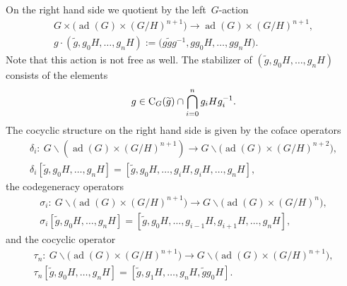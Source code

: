 \documentclass[pdftex]{sigma}
\numberwithin{equation}{section}
\DeclareMathOperator{\ad}{ad}
\begin{document}
On the right hand side we quotient by the left~$G$-action
\begin{gather*}%
G\times \big(\ad(G)\times (G/H)^{n+1}\big) \longrightarrow \ad(G)\times (G/H)^{n+1},
\\
g\cdot(\widetilde{g}, g_{0}H,\ldots, g_{n}H) :=\big(g\widetilde{g}g^{-1}, g g_{0}H,\ldots, g g_{n}H\big).
\end{gather*}
Note that this action is not free as well.
The stabilizer of $(\widetilde{g}, g_{0}H,\ldots, g_{n}H)$ consists of the elements
\begin{gather}
\label{stab-RHS}
g   \in {\rm C}_{G}(\widetilde{g})\cap\bigcap_{i=0}^{n}g_{i}H g_{i}^{-1}.
\end{gather}
The cocyclic structure on the right hand side is given by the coface operators
\begin{gather}
\delta_{i}\colon \  G\backslash (\ad(G)\times (G/H)^{n+1}) \longrightarrow G\backslash \big(\ad(G)\times (G/H)^{n+2}\big),
\nonumber
\\
\delta_{i}[\widetilde{g}, g_{0}H,\ldots, g_{n}H] =\left[\widetilde{g}, g_{0}H,\ldots, g_{i}H, g_{i}H,\ldots,g_{n}H\right],
\label{cofaces-RHS}
\end{gather}
the codegeneracy operators
\begin{gather}
\sigma_{i}\colon \  G\backslash \big(\ad(G)\times (G/H)^{n+1}\big) \longrightarrow G\backslash \big(\ad(G)\times (G/H)^{n}\big),
\nonumber
\\
\sigma_{i}[\widetilde{g}, g_{0}H,\ldots, g_{n}H] =[\widetilde{g}, g_{0}H,\ldots,g_{i-1}H, g_{i+1}H, \ldots, g_{n}H],
\label{codegen-RHS}
\end{gather}
and the cocyclic operator
\begin{gather}
\tau_{n}\colon \  G\backslash \big(\ad(G)\times (G/H)^{n+1}\big) \longrightarrow G\backslash \big(\ad(G)\times (G/H)^{n+1}\big),
\nonumber
\\
\tau_{n}[\widetilde{g}, g_{0}H,\ldots, g_{n}H] =\left[\widetilde{g}, g_{1}H,\ldots, g_{n}H, \widetilde{g}g_{0}H\right].
\label{cyclic-op-RHS}
\end{gather}
\end{document}
